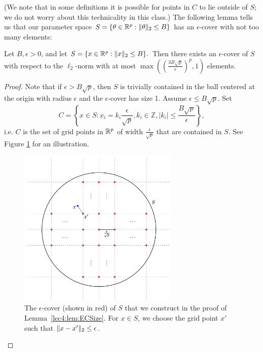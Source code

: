 (We note that in some definitions it is possible for points in $C$ to lie outside of $S$; we do not worry about this technicality in this class.) The following lemma tells us that our parameter space $S = \{\theta \in \mathbb R^p: \|\theta\|_2 \le B\}$ has an $\epsilon$-cover with not too many elements:

\begin{lemma}\label{lec4:lem:ECSize}
Let $B,\epsilon>0$, and let $S = \{x \in \mathbb R^p: \|x\|_2 \le B\}.$ Then there exists an $\epsilon$-cover of $S$ with respect to the $\ell_2$-norm with at most $\max \left (\left(\frac{3B\sqrt{p}}{\epsilon}\right)^p, 1 \right)$  elements.
\end{lemma}

\begin{proof}
Note that if $\epsilon > B\sqrt{p}$, then $S$ is trivially contained in the ball centered at the origin with radius $\epsilon$ and the $\epsilon$-cover has size 1. Assume $\epsilon \leq B \sqrt{p}$. Set
\begin{equation}
C = \left\{ x \in S: x_i = k_i \frac{\epsilon}{\sqrt{p}}, k_i \in \mathbb{Z}, |k_i| \leq  \frac{B\sqrt{p}}{\epsilon}  \right\},
\end{equation}
i.e. $C$ is the set of grid points in $\mathbb R^p$ of width $\tfrac{\epsilon}{\sqrt{p}}$ that are contained in $S$. See Figure \ref{lec5:fig:ecover} for an illustration. 
\begin{figure}[ht]
\centerline{\includegraphics[width=3in]{figures/ECover.png}}
\caption[lec5:fig:ecover]{The $\epsilon$-cover (shown in red) of $S$ that we construct in the proof of Lemma~\ref{lec4:lem:ECSize}. For $x \in S$, we choose the grid point $x'$ such that $\|x-x'\|_2 \le \epsilon$.}
\label{lec5:fig:ecover}
\end{figure}


\end{proof}

